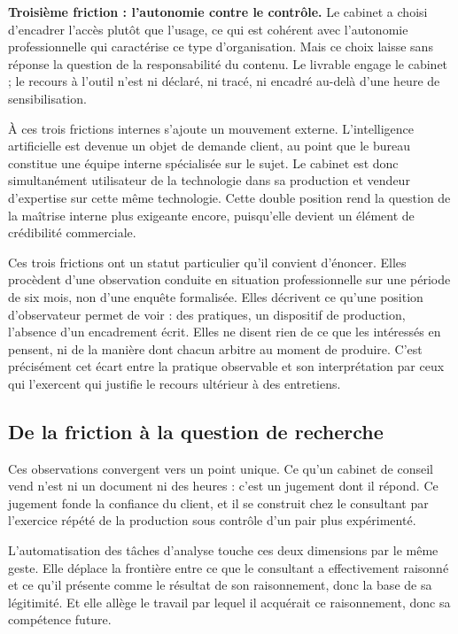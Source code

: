 \textbf{Troisième friction : l'autonomie contre le contrôle.} Le cabinet a choisi
d'encadrer l'accès plutôt que l'usage, ce qui est cohérent avec l'autonomie professionnelle
qui caractérise ce type d'organisation. Mais ce choix laisse sans réponse la question de la
responsabilité du contenu. Le livrable engage le cabinet ; le recours à l'outil n'est ni
déclaré, ni tracé, ni encadré au-delà d'une heure de sensibilisation.

À ces trois frictions internes s'ajoute un mouvement externe. L'intelligence artificielle
est devenue un objet de demande client, au point que le bureau constitue une équipe interne
spécialisée sur le sujet. Le cabinet est donc simultanément utilisateur de la technologie
dans sa production et vendeur d'expertise sur cette même technologie. Cette double position
rend la question de la maîtrise interne plus exigeante encore, puisqu'elle devient un
élément de crédibilité commerciale.

Ces trois frictions ont un statut particulier qu'il convient d'énoncer. Elles procèdent
d'une observation conduite en situation professionnelle sur une période de six mois, non
d'une enquête formalisée. Elles décrivent ce qu'une position d'observateur permet de voir :
des pratiques, un dispositif de production, l'absence d'un encadrement écrit. Elles ne
disent rien de ce que les intéressés en pensent, ni de la manière dont chacun arbitre au
moment de produire. C'est précisément cet écart entre la pratique observable et son
interprétation par ceux qui l'exercent qui justifie le recours ultérieur à des entretiens.

\subsection{De la friction à la question de recherche}

Ces observations convergent vers un point unique. Ce qu'un cabinet de conseil vend n'est ni
un document ni des heures : c'est un jugement dont il répond. Ce jugement fonde la
confiance du client, et il se construit chez le consultant par l'exercice répété de la
production sous contrôle d'un pair plus expérimenté.

L'automatisation des tâches d'analyse touche ces deux dimensions par le même geste. Elle
déplace la frontière entre ce que le consultant a effectivement raisonné et ce qu'il
présente comme le résultat de son raisonnement, donc la base de sa légitimité. Et elle
allège le travail par lequel il acquérait ce raisonnement, donc sa compétence future.

